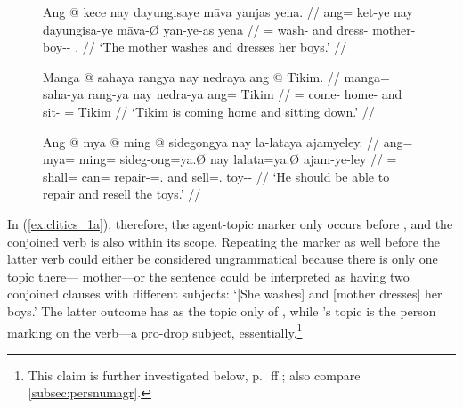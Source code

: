 \begin{figure}
\pex\label{ex:clitics_1}
\a\label{ex:clitics_1a}\begingl
	\gla Ang @ kece nay dayungisaye māva yanjas yena. //
	\glb ang= ket-ye nay dayungisa-ye māva-Ø yan-ye-as yena //
	\glc \AgtT{}= wash-\TsgF{} and dress-\TsgF{} mother-\Top{}
		boy-\Pl{}-\Parg{} \TsgF{}.\Gen{} //
	\glft `The mother washes and dresses her boys.' //
\endgl

\a\label{ex:clitics_1b}\begingl
	\gla Manga @ sahaya rangya nay nedraya ang @ Tikim. //
	\glb manga= saha-ya rang-ya nay nedra-ya ang= Tikim //
	\glc \Prog{}= come-\TsgM{} home-\Loc{} and sit-\TsgM{} \Aarg{}= Tikim //
	\glft `Tikim is coming home and sitting down.' //
\endgl

\a\label{ex:clitics_1c}\begingl
	\gla Ang @ mya @ ming @ sidegongya nay la-lataya ajamyeley. //
	\glb ang= mya= ming= sideg-ong=ya.Ø nay la\til{}lata=ya.Ø ajam-ye-ley //
	\glc \AgtT{}= shall= can= repair-\Irr{}=\TsgM{}.\Top{} and
		\Iter{}\til{}sell=\TsgM{}.\Top{} toy-\Pl{}-\PargI{} //
	\glft `He should be able to repair and resell the toys.' //
\endgl
\xe
\end{figure}

\label{clitics_preverb_top}
In (\ref{ex:clitics_1a}), therefore, the agent-topic 
marker  only occurs before , and
the conjoined verb  is also within
its scope. Repeating the marker as well before the latter verb could either be
considered ungrammatical because there is only one topic
there--- {mother}---or the sentence could be interpreted as
having two conjoined clauses with different subjects: `[She washes] and [mother
dresses] her boys.' The latter outcome has  as the topic only
of , while 's topic is the person
marking on the verb---a pro-drop subject, essentially.\footnote{This claim is
further investigated below, p.~\pageref{subsubsec:suffixes}\,ff.; also compare
\autoref{subsec:persnumagr}.}

